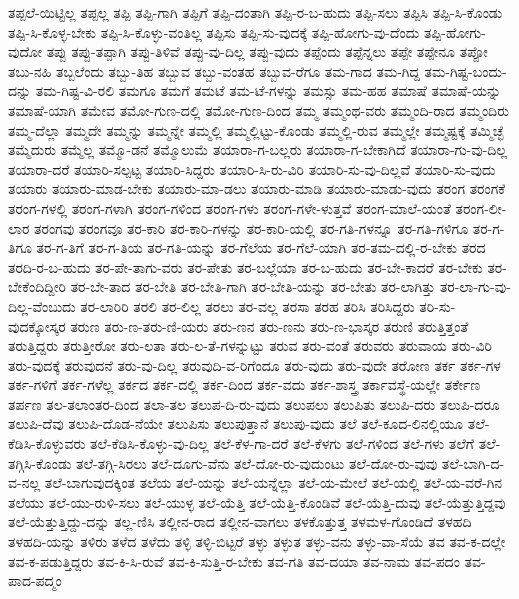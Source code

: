{ತಪ್ಪಲೆ-ಯಿಟ್ಟಿಲ್ಲ
ತಪ್ಪಲ್ಲ
ತಪ್ಪಿ
ತಪ್ಪಿ-ಗಾಗಿ
ತಪ್ಪಿಗೆ
ತಪ್ಪಿ-ದಂತಾಗಿ
ತಪ್ಪಿ-ರ-ಬ-ಹುದು
ತಪ್ಪಿ-ಸಲು
ತಪ್ಪಿಸಿ
ತಪ್ಪಿ-ಸಿ-ಕೊಂಡು
ತಪ್ಪಿ-ಸಿ-ಕೊಳ್ಳ-ಬೇಕು
ತಪ್ಪಿ-ಸಿ-ಕೊಳ್ಳು-ವಂತಿಲ್ಲ
ತಪ್ಪಿಸು
ತಪ್ಪಿ-ಸು-ವುದಕ್ಕೆ
ತಪ್ಪಿ-ಹೋಗು-ವು-ದೆಂದು
ತಪ್ಪಿ-ಹೋಗು-ವುದೋ
ತಪ್ಪು
ತಪ್ಪು-ತಪ್ಪಾಗಿ
ತಪ್ಪು-ತಿಳಿವೆ
ತಪ್ಪು-ವು-ದಿಲ್ಲ
ತಪ್ಪು-ವುದು
ತಪ್ಪೆಂದು
ತಪ್ಪೆನ್ನಲು
ತಪ್ಪೇ
ತಪ್ಪೇನೂ
ತಪ್ಪೋ
ತಬು-ನಹಿ
ತಬ್ಬಲೆಂದು
ತಬ್ಬು-ತಿಹ
ತಬ್ಬುವ
ತಬ್ಬು-ವಂತಹ
ತಬ್ಬುವ-ರೆಗೂ
ತಮ-ಗಾದ
ತಮ-ಗಿದ್ದ
ತಮ-ಗಿಷ್ಟ-ಬಂದು-ದನ್ನು
ತಮ-ಗಿಷ್ಟ-ವಿ-ರಲಿ
ತಮಗೂ
ತಮಗೆ
ತಮಟೆ
ತಮ-ಟೆ-ಗಳನ್ನು
ತಮಸ್ಸು
ತಮ-ಹಹ
ತಮಾಷೆ
ತಮಾಷೆ-ಯನ್ನು
ತಮಾಷೆ-ಯಾಗಿ
ತಮೇವ
ತಮೋ-ಗುಣ-ದಲ್ಲಿ
ತಮೋ-ಗುಣ-ದಿಂದ
ತಮ್ಮ
ತಮ್ಮಂಥ-ವರು
ತಮ್ಮಂದಿ-ರಾದ
ತಮ್ಮಂದಿರು
ತಮ್ಮ-ದೆಲ್ಲಾ
ತಮ್ಮದೇ
ತಮ್ಮನ್ನು
ತಮ್ಮನ್ನೇ
ತಮ್ಮಲ್ಲಿ
ತಮ್ಮಲ್ಲಿಟ್ಟು-ಕೊಂಡು
ತಮ್ಮಲ್ಲಿ-ರುವ
ತಮ್ಮಲ್ಲೇ
ತಮ್ಮಷ್ಟಕ್ಕೆ
ತಮ್ಮಿಚ್ಛೆ
ತಮ್ಮೆದುರು
ತಮ್ಮೆಲ್ಲ
ತಮ್ಮೊ-ಡನೆ
ತಮ್ಮೊಲುಮೆ
ತಯಾರಾ-ಗ-ಬಲ್ಲರು
ತಯಾರಾ-ಗ-ಬೇಕಾಗಿದೆ
ತಯಾರಾ-ಗು-ವು-ದಿಲ್ಲ
ತಯಾರಾ-ದರೆ
ತಯಾರಿ-ಸಲ್ಪಟ್ಟ
ತಯಾರಿ-ಸಿದ್ದರು
ತಯಾರಿ-ಸಿ-ರು-ವಿರಿ
ತಯಾರಿ-ಸು-ವು-ದಿಲ್ಲವೆ
ತಯಾರಿ-ಸು-ವುದು
ತಯಾರು
ತಯಾರು-ಮಾಡ-ಬೇಕು
ತಯಾರು-ಮಾ-ಡಲು
ತಯಾರು-ಮಾಡಿ
ತಯಾರು-ಮಾಡು-ವುದು
ತರಂಗ
ತರಂಗಕೆ
ತರಂಗ-ಗಳಲ್ಲಿ
ತರಂಗ-ಗಳಾಗಿ
ತರಂಗ-ಗಳಿಂದ
ತರಂಗ-ಗಳು
ತರಂಗ-ಗಳೇ-ಳುತ್ತವೆ
ತರಂಗ-ಮಾಲೆ-ಯಂತೆ
ತರಂಗ-ಲೀ-ಲಾರ
ತರಂಗವು
ತರಂಗವೂ
ತರ-ಕಾರಿ
ತರ-ಕಾರಿ-ಗಳನ್ನು
ತರ-ಕಾರಿ-ಯಲ್ಲಿ
ತರ-ಗತಿ-ಗಳನ್ನೂ
ತರ-ಗತಿ-ಗಳಿಗೂ
ತರ-ಗ-ತಿಗೂ
ತರ-ಗ-ತಿಗೆ
ತರ-ಗ-ತಿಯ
ತರ-ಗತಿ-ಯನ್ನು
ತರ-ಗೆಲೆಯ
ತರ-ಗೆಲೆ-ಯಾಗಿ
ತರ-ತಮ-ದಲ್ಲಿ-ರ-ಬೇಕು
ತರದ
ತರದಿ-ರ-ಬ-ಹುದು
ತರ-ಪೇ-ತಾಗು-ವರು
ತರ-ಪೇತು
ತರ-ಬಲ್ಲೆಯಾ
ತರ-ಬ-ಹುದು
ತರ-ಬೇ-ಕಾದರೆ
ತರ-ಬೇಕು
ತರ-ಬೇಕೆಂದಿದ್ದೀರಿ
ತರ-ಬೇ-ತಾದ
ತರ-ಬೇತಿ
ತರ-ಬೇತಿ-ಗಾಗಿ
ತರ-ಬೇತಿ-ಯನ್ನು
ತರ-ಬೇತು
ತರ-ಲಾಗಿತ್ತು
ತರ-ಲಾ-ಗು-ವು-ದಿಲ್ಲ-ವೆಂಬುದು
ತರ-ಲಾರಿರಿ
ತರಲಿ
ತರ-ಲಿಲ್ಲ
ತರಲು
ತರ-ವಲ್ಲ
ತರಸಾ
ತರಹ
ತರಿಸಿ
ತರಿಸಿದ್ದರು
ತರಿ-ಸು-ವುದಕ್ಕೋಸ್ಕರ
ತರುಣ
ತರು-ಣ-ತರು-ಣಿ-ಯರು
ತರು-ಣನ
ತರು-ಣನು
ತರು-ಣ-ಭಾಸ್ಕರ
ತರುಣಿ
ತರುತ್ತಿತ್ತಂತೆ
ತರುತ್ತಿದ್ದರು
ತರುತ್ತೀರೋ
ತರು-ಲತಾ
ತರು-ಲ-ತೆ-ಗಳನ್ನುಟ್ಟು
ತರುವ
ತರು-ವಂತೆ
ತರುವರು
ತರುವಾಯ
ತರು-ವಿರಿ
ತರು-ವುದಕ್ಕೆ
ತರುವುದನೆ
ತರು-ವು-ದಿಲ್ಲ
ತರುವುದಿ-ವ-ರಿಗೆಂದೂ
ತರು-ವುದು
ತರು-ವುದೇ
ತರೋಣ
ತರ್ಕ
ತರ್ಕ-ಗಳ
ತರ್ಕ-ಗಳಿಗೆ
ತರ್ಕ-ಗಳೆಲ್ಲ
ತರ್ಕದ
ತರ್ಕ-ದಲ್ಲಿ
ತರ್ಕ-ದಿಂದ
ತರ್ಕ-ವದು
ತರ್ಕ-ಶಾಸ್ತ್ರ
ತರ್ಕಾವಸ್ಥೆ-ಯಲ್ಲೇ
ತರ್ಕೇಣ
ತರ್ಪಣ
ತಲ-ತಲಾಂತರ-ದಿಂದ
ತಲಾ-ತಲ
ತಲುಪ-ದಿ-ರು-ವುದು
ತಲುಪಲು
ತಲುಪಿತು
ತಲುಪಿ-ದರು
ತಲುಪಿ-ದರೂ
ತಲುಪಿ-ದೆವು
ತಲುಪಿ-ದೊಡ-ನೆಯೇ
ತಲುಪಿಸು
ತಲುಪುತ್ತಾನೆ
ತಲುಪು-ವುದು
ತಲೆ
ತಲೆ-ಕೂದ-ಲಿನಲ್ಲಿಯೂ
ತಲೆ-ಕೆಡಿಸಿ-ಕೊಳ್ಳುವರು
ತಲೆ-ಕೆಡಿಸಿ-ಕೊಳ್ಳು-ವು-ದಿಲ್ಲ
ತಲೆ-ಕೆಳ-ಗಾ-ದರೆ
ತಲೆ-ಕೆಳಗು
ತಲೆ-ಗಳಿಂದ
ತಲೆ-ಗಳು
ತಲೆಗೆ
ತಲೆ-ತಗ್ಗಿಸಿ-ಕೊಂಡು
ತಲೆ-ತಗ್ಗಿ-ಸಿರಲು
ತಲೆ-ದೂಗು-ವೆನು
ತಲೆ-ದೋ-ರು-ವುದುಂಟು
ತಲೆ-ದೋ-ರು-ವುವು
ತಲೆ-ಬಾಗಿ-ದ-ವ-ನಲ್ಲ
ತಲೆ-ಬಾಗುವುದಕ್ಕಿಂತ
ತಲೆಯ
ತಲೆ-ಯನ್ನು
ತಲೆ-ಯನ್ನೆಲ್ಲಾ
ತಲೆ-ಯ-ಮೇಲೆ
ತಲೆ-ಯಲ್ಲಿ
ತಲೆ-ಯ-ವರೆ-ಗಿನ
ತಲೆಯು
ತಲೆ-ಯು-ರುಳಿ-ಸಲು
ತಲೆ-ಯುಳ್ಳ
ತಲೆ-ಯೆತ್ತಿ
ತಲೆ-ಯೆತ್ತಿ-ಕೊಂಡಿವೆ
ತಲೆ-ಯೆತ್ತಿ-ದುವು
ತಲೆ-ಯೆತ್ತುತ್ತಿದ್ದವು
ತಲೆ-ಯೆತ್ತುತ್ತಿದ್ದು-ದನ್ನು
ತಲ್ಲ-ಣಿಸಿ
ತಲ್ಲೀನ-ರಾದ
ತಲ್ಲೀನ-ವಾಗಲು
ತಳಕೊತ್ತುತ್ತ
ತಳಮಳ-ಗೊಂಡಿದೆ
ತಳಹದಿ
ತಳಹದಿ-ಯನ್ನು
ತಳಿರು
ತಳೆದ
ತಳೆದು
ತಳ್ಳಿ
ತಳ್ಳಿ-ಬಿಟ್ಟರೆ
ತಳ್ಳು
ತಳ್ಳುತ
ತಳ್ಳು-ವನು
ತಳ್ಳು-ವಾ-ಸೆಯೆ
ತವ
ತವ-ಕ-ದಲ್ಲೇ
ತವ-ಕ-ಪಡುತ್ತಿದ್ದರು
ತವ-ಕಿ-ಸಿ-ರುವೆ
ತವ-ಕಿ-ಸುತ್ತಿ-ರ-ಬೇಕು
ತವ-ಗತಿ
ತವ-ದಯಾ
ತವ-ನಾಮ
ತವ-ಪದಂ
ತವ-ಪಾದ-ಪದ್ಮಂ
}

